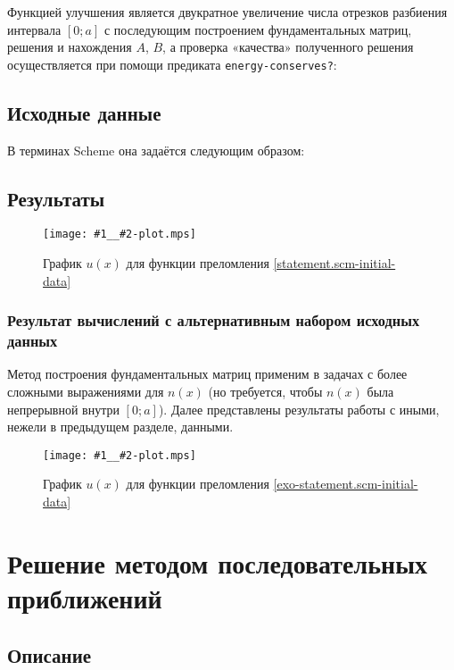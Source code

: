 \documentclass{article}
\newcommand{\procname}[1]{\texttt{#1}}
\newcommand{\includeplot}[2]{\begin{figure}[hb]
    \centering
    \texttt{[image: \#1\_\_\#2-plot.mps]}
    \caption{График $u(x)$ для функции преломления \eqref{#2-initial-data}}
\end{figure}}
\numberwithin{equation}{section}
\begin{document}
Функцией улучшения является двукратное увеличение числа отрезков
разбиения интервала $[0;a]$ с последующим построением фундаментальных
матриц, решения и нахождения $A$, $B$, а проверка «качества»
полученного решения осуществляется при помощи предиката
\procname{energy-conserves?}:



\clearpage

\subsection{Исходные данные}


В терминах Scheme она задаётся следующим образом:



\subsection{Результаты}



\includeplot{fundmatrix}{statement.scm}

\clearpage

\subsubsection{Результат вычислений  с альтернативным набором исходных данных}

Метод построения фундаментальных матриц применим в задачах с более
сложными выражениями для $n(x)$ (но требуется, чтобы $n(x)$ была
непрерывной внутри $[0;a]$). Далее представлены результаты работы
с иными, нежели в предыдущем разделе, данными.





\includeplot{fundmatrix}{exo-statement.scm}

\clearpage

\section{Решение методом последовательных приближений}

\subsection{Описание}
\end{document}
